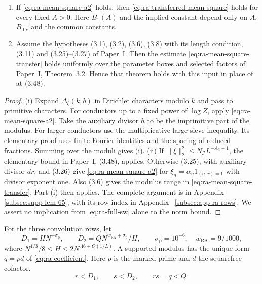 \begin{lemma}
\label{hyp:ra-ms-transfer}
\begin{enumerate}
 \item[(i)] If \eqref{eq:ra-mean-square-a2} holds, then
 \eqref{eq:ra-transferred-mean-square} holds for every fixed \(A>0\).
 Here \(B_1(A)\) and the implied constant depend only on \(A\),
 \(B_{\mathrm{div}}\) and the common constants.
 \item[(ii)] Assume the hypotheses (3.1), (3.2), (3.6), (3.8) with its
 length condition, (3.11) and (3.25)--(3.27) of Paper~I. Then the estimate
 \eqref{eq:ra-mean-square-transfer} holds uniformly over the parameter
 boxes and selected factors of Paper~I, Theorem~3.2. Hence that theorem
 holds with this input in place of \cite[Theorem~0(a)]{BFI86} at (3.48).
\end{enumerate}
\end{lemma}
\begin{proof}
(i) Expand \(\Delta_\xi(k,b)\) in Dirichlet characters modulo \(k\) and
pass to primitive characters. For conductors up to a fixed power of
\(\log Z\), apply \eqref{eq:ra-mean-square-a2}.
Take the auxiliary divisor
\(h\) to be the imprimitive part of the modulus. For larger conductors
use the multiplicative large sieve inequality.
Its elementary proof uses
finite Fourier identities and the spacing of reduced fractions.
Summing over the moduli gives (i).
(ii) If \(\|\xi\|_2^2\le N_{\mathcal I}L^{-A_3-1}\), the elementary bound
in Paper~I, (3.48), applies. Otherwise (3.25), with auxiliary divisor
\(dr\), and (3.26) give \eqref{eq:ra-mean-square-a2} for
\(\xi_n=\alpha_n1_{(n,r)=1}\) with divisor exponent one. Also (3.6) gives
the modulus range in \eqref{eq:ra-mean-square-transfer}. Part (i) then
applies. The complete argument is in Appendix~
\hyperref[subsec:supp-lem-65]{\ref*{subsec:supp-lem-65}}, with its
row index in Appendix~
\hyperref[subsec:app-ra-rows]{\ref*{subsec:app-ra-rows}}. We assert no implication from
\eqref{eq:ra-full-sw} alone to the norm bound.
\end{proof}

For the three convolution rows, let
\begin{equation}\label{eq:ra-l52-scales}
 D_1=HN^{-\sigma_{\mathrm p}},\qquad
 D_2=QN^{w_{\mathrm{RA}}+\sigma_{\mathrm p}}/H,\qquad
 \sigma_{\mathrm p}=10^{-6},\quad w_{\mathrm{RA}}=9/1000,
\end{equation}
where \(N^{1/3}/8\le H\le2N^{.46+O(1/L)}\).
A supported modulus has
the unique form \(q=pd\) of \eqref{eq:ra-coefficient}.
Here \(p\) is the marked prime and \(d\) the squarefree cofactor.
\begin{equation}\label{eq:ra-l52-caps}
 r<D_1,\qquad s<D_2,\qquad rs=q<Q.
\end{equation}

